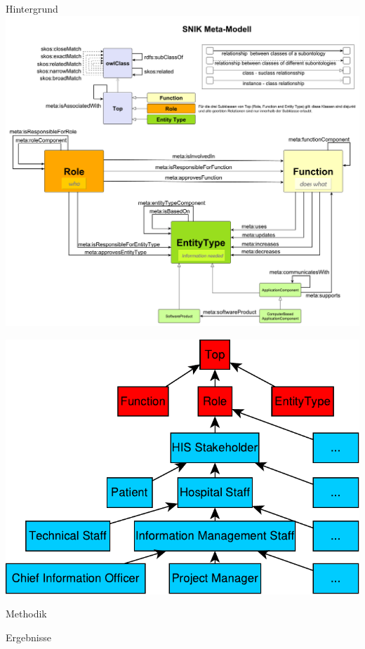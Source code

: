 \documentclass[portrait,final,a0paper,fontscale=0.320]{imiseposter}
\begin{document}
\begin{poster}
\begin{posterbox}[name=background,column=0,row=0]{Hintergrund}
\includegraphics[width=\linewidth]{../Dokumentation/Images/snik-metamodel.pdf}

\includegraphics[width=0.5\linewidth]{../Dokumentation/Images/hierarchy.pdf}

\blindtext
\end{posterbox}
\begin{posterbox}[name=methods,below=background]{Methodik}
\blindtext
\end{posterbox}
\begin{posterbox}[name=results,column=1]{Ergebnisse}
  

\end{posterbox}
\end{poster}
\end{document}
